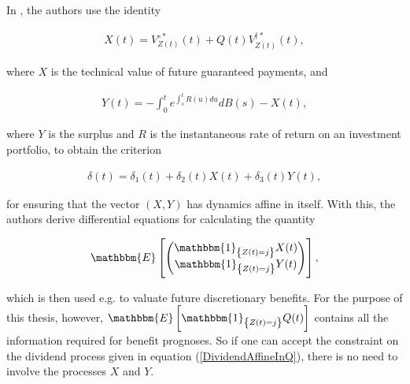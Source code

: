 \documentclass{book}
\newcommand{\1}[1]{\mathbbm{1}_{\left\lbrace #1 \right\rbrace}}
\newcommand{\expec}[1][def]{\mathbbm{E} \left[ #1 \right]}
\theoremstyle{break}
\theoremstyle{remark}
\newenvironment{remark}
  {\pushQED{\qed}\renewcommand{\qedsymbol}{\scalebox{1.4}{$\circ$}}\remarkx}
  {\popQED\endremarkx}
\numberwithin{equation}{section}
\begin{document}
\begin{remark}
In \cite{Lollike}, the authors use the identity

\begin{align*}
    X(t) = V_{Z(t)}^{\circ*}(t) + Q(t) V_{Z(t)}^{\dagger*}(t),
\end{align*}

where $X$ is the technical value of future guaranteed payments, and

\begin{align*}
    Y(t) = - \int_0^t e^{\int_s^t R(u)du} dB(s) - X(t),
\end{align*}

where $Y$ is the surplus and $R$ is the instantaneous rate of return on an investment portfolio, to obtain the criterion

\begin{align*}
    \delta(t) = \delta_1(t) + \delta_2(t) X(t) + \delta_3(t) Y(t),
\end{align*}

for ensuring that the vector $(X,Y)$ has dynamics affine in itself. With this, the authors derive differential equations for calculating the quantity

\begin{align*}
    \expec[\begin{pmatrix}\1{Z(t)=j} X(t)\\\1{Z(t)=j} Y(t)\end{pmatrix}],
\end{align*}

which is then used e.g. to valuate future discretionary benefits. For the purpose of this thesis, however, $\expec[\1{Z(t)=j} Q(t)]$ contains all the information required for benefit prognoses. So if one can accept the constraint on the dividend process given in equation (\ref{DividendAffineInQ}), there is no need to involve the processes $X$ and $Y$.
\end{remark}
\end{document}

